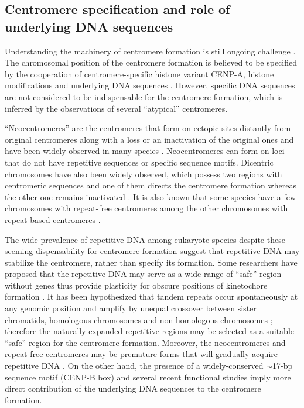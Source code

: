 \subsection*{Centromere specification and role of underlying DNA sequences}
  Understanding the machinery of centromere formation is still ongoing challenge \cite{Plohl2014, Fukagawa2014, McKinley2016}. The chromosomal position of the centromere formation is believed to be specified by the cooperation of centromere-specific histone variant CENP-A, histone modifications and underlying DNA sequences \cite{Fukagawa2014}. However, specific DNA sequences are not considered to be indispensable for the centromere formation, which is inferred by the observations of several ``atypical'' centromeres.

  ``Neocentromeres'' are the centromeres that form on ectopic sites distantly from original centromeres along with a loss or an inactivation of the original ones and have been widely observed in many species \cite{Marshall2008, Scott2014}. Neocentromeres can form on loci that do not have repetitive sequences or specific sequence motifs. Dicentric chromosomes have also been widely observed, which possess two regions with centromeric sequences and one of them directs the centromere formation whereas the other one remains inactivated \cite{Earnshaw1985, Steiner1994, Han2006}. It is also known that some species have a few chromosomes with repeat-free centromeres among the other chromosomes with repeat-based centromeres \cite{Piras2010, Shang2010, Locke2011}.

  The wide prevalence of repetitive DNA among eukaryote species despite these seeming dispensability for centromere formation suggest that repetitive DNA may stabilize the centromere, rather than specify its formation. Some researchers have proposed that the repetitive DNA may serve as a wide range of ``safe'' region without genes thus provide plasticity for obscure positions of kinetochore formation \cite{Plohl2014, Fukagawa2014}. It has been hypothesized that tandem repeats occur spontaneously at any genomic position and amplify by unequal crossover between sister chromatids, homologous chromosomes and non-homologous chromosomes \cite{Smith1976, Willard1991, Charlesworth1994}; therefore the naturally-expanded repetitive regions may be selected as a suitable ``safe'' region for the centromere formation. Moreover, the neocentromeres and repeat-free centromeres may be premature forms that will gradually acquire repetitive DNA \cite{Fukagawa2014}. On the other hand, the presence of a widely-conserved $\sim$17-bp sequence motif (CENP-B box) and several recent functional studies \cite{Henikoff2015, Aldrup-MacDonald2016} imply more direct contribution of the underlying DNA sequences to the centromere formation.


